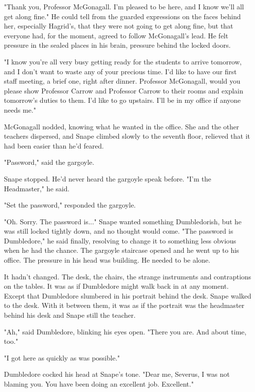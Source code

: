 "Thank you, Professor McGonagall. I'm pleased to be here, and I know we'll all get along fine." He could tell from the guarded expressions on the faces behind her, especially Hagrid's, that they were not going to get along fine, but that everyone had, for the moment, agreed to follow McGonagall's lead. He felt pressure in the sealed places in his brain, pressure behind the locked doors.

"I know you're all very busy getting ready for the students to arrive tomorrow, and I don't want to waste any of your precious time. I'd like to have our first staff meeting, a brief one, right after dinner. Professor McGonagall, would you please show Professor Carrow and Professor Carrow to their rooms and explain tomorrow's duties to them. I'd like to go upstairs. I'll be in my office if anyone needs me."

McGonagall nodded, knowing what he wanted in the office. She and the other teachers dispersed, and Snape climbed slowly to the seventh floor, relieved that it had been easier than he'd feared.

"Password," said the gargoyle.

Snape stopped. He'd never heard the gargoyle speak before. "I'm the Headmaster," he said.

"Set the password," responded the gargoyle.

"Oh. Sorry. The password is..." Snape wanted something Dumbledorish, but he was still locked tightly down, and no thought would come. "The password is Dumbledore," he said finally, resolving to change it to something less obvious when he had the chance. The gargoyle staircase opened and he went up to his office. The pressure in his head was building. He needed to be alone.

It hadn't changed. The desk, the chairs, the strange instruments and contraptions on the tables. It was as if Dumbledore might walk back in at any moment. Except that Dumbledore slumbered in his portrait behind the desk. Snape walked to the desk. With it between them, it was as if the portrait was the headmaster behind his desk and Snape still the teacher.

"Ah," said Dumbledore, blinking his eyes open. "There you are. And about time, too."

"I got here as quickly as was possible."

Dumbledore cocked his head at Snape's tone. "Dear me, Severus, I was not blaming you. You have been doing an excellent job. Excellent."

